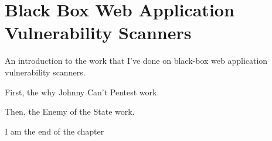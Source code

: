 \chapter{Black Box Web Application Vulnerability Scanners}


An introduction to the work that I've done on black-box web
application vulnerability scanners.

First, the why Johnny Can't Pentest work.

Then, the Enemy of the State work.


I am the end of the chapter
